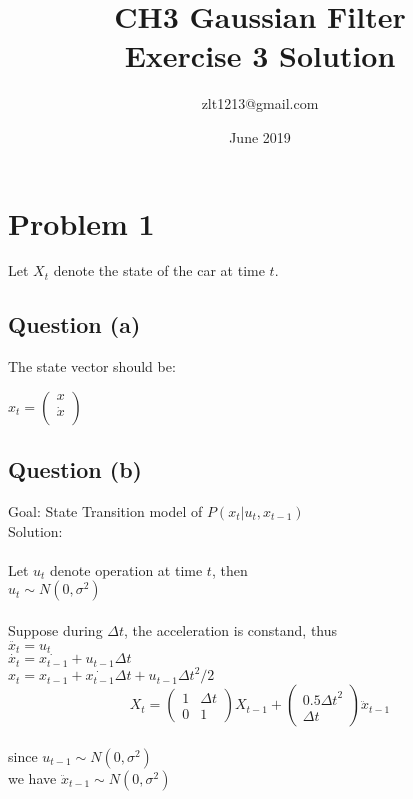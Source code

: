 \documentclass{article}
\title{ CH3 Gaussian Filter \\  Exercise 3 Solution}
\author{zlt1213@gmail.com}
\date{June 2019}
\begin{document}
\maketitle

\section{Problem 1}
Let $X_t$ denote the state of the car at time $t$. 
\subsection{Question (a)}
The state vector should be:

$
x_t = 
\begin{pmatrix}
x \\
\dot{x} \\
\end{pmatrix}
$



\subsection{Question (b)}
Goal: State Transition model of $P(x_t | u_t, x_{t-1})$ \\
Solution:\\ \\
Let $u_t$ denote operation at time $t$, then \\
$u_t\sim{N(0, \sigma^2)}$ \\ \\
Suppose during $\Delta t$, the acceleration is constand, thus\\
$\ddot{x_t}=u_t$\\
$\dot{x_t} = \dot{x_{t-1}}+u_{t-1} \Delta t$ \\
$x_t = x_{t-1}+ \dot{x_{t-1}}\Delta t + u_{t-1}{\Delta t}^2/2$\\

$$
X_t = 
\begin{pmatrix}
1 & \Delta t \\
0 & 1 
\end{pmatrix} X_{t-1} + 
\begin{pmatrix}
0.5{\Delta t}^2  \\
\Delta t
\end{pmatrix} \ddot{x}_{t-1}
$$\\
since $u_{t-1}\sim{N(0, \sigma^2)}$\\
we have $\ddot{x}_{t-1}\sim{N(0, \sigma^2)}$\\
\end{document}
